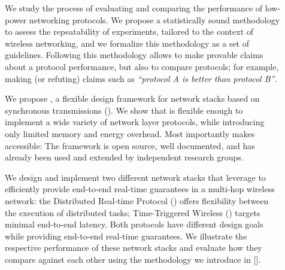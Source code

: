 \begin{description}

%
\item[]%
We study the process of evaluating and comparing the performance of low-power networking protocols.
We propose a statistically sound methodology to assess the repeatability of experiments, tailored to the context of wireless networking,
and we formalize this methodology as a set of guidelines.
Following this methodology allows to make provable claims about a protocol performance, but also to compare protocols; for example, making (or refuting) claims such as \emph{``protocol A is better than protocol B''}.


\item[]%
We propose \baloo, a flexible design framework for network stacks based on synchronous transmissions (\ST).
We show that \baloo is flexible enough to implement a wide variety of network layer protocols, while introducing only limited memory and energy overhead. Most importantly \baloo makes \ST accessible: The framework is open source, well documented,
and has already been used and extended by independent research groups.

%
\item[]%
We design and implement two different network stacks that leverage \ST to efficiently provide end-to-end real-time guarantees in a multi-hop wireless network:
the Distributed Real-time Protocol (\DRP) offers flexibility between the execution of distributed tasks;
Time-Triggered Wireless (\TTW) targets minimal end-to-end latency.
Both protocols have different design goals while providing end-to-end real-time guarantees.
We illustrate the respective performance of these network stacks and evaluate how they compare against each other using the methodology we introduce in [].

\end{description}

